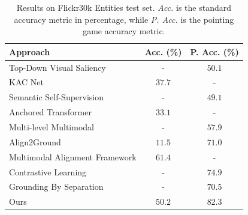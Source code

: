 \begin{table}
  \centering
  \begin{tabular}{lcc}
    \toprule
    Approach & Acc. (\%) & P. Acc. (\%) \\
    \midrule
    Top-Down Visual Saliency \cite{ramanishka2017top}        & -      & $50.1$ \\
    KAC Net \cite{chen2018knowledge}                         & $37.7$ & -      \\
    Semantic Self-Supervision \cite{javed2018learning}       & -      & $49.1$ \\
    Anchored Transformer \cite{zhao2018weakly}               & $33.1$ & -      \\
    Multi-level Multimodal \cite{akbari2019multi}            & -      & $57.9$ \\
    Align2Ground \cite{datta2019align2ground}                & $11.5$ & $71.0$ \\
    Multimodal Alignment Framework \cite{wang2020maf}        & $\bm{61.4}$ & -    \\
    Contrastive Learning \cite{gupta2020contrastive}         & -      & $74.9$ \\
    Grounding By Separation \cite{arbelle2021detector}       & -      & $70.5$ \\
    \midrule
    Ours                                                     & $50.2$ & $82.3$ \\
    \bottomrule
  \end{tabular}
  \caption[Results on Flickr30k Entities test set]{Results on
  Flickr30k Entities test set. \textit{Acc.} is the standard accuracy
  metric in percentage, while \textit{P. Acc.} is the pointing game
  accuracy metric.}
  \label{tab:results-flickr30k}
\end{table}

